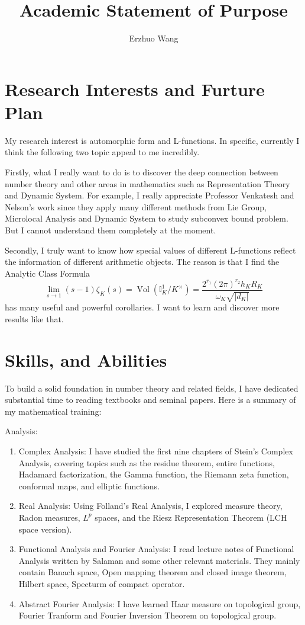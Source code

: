 \documentclass[12pt]{article}
\title{Academic Statement of Purpose}
\author{Erzhuo Wang}
\date{}
\newcommand{\bb}[1]{\mathbb{#1}}
\newenvironment{enu}{\begin{enumerate}[(1)]}{\end{enumerate}}
\theoremstyle{definition}
\begin{document}
\maketitle 
\section{Research Interests and Furture Plan}
My research interest is automorphic form and L-functions. In specific, currently I think the following two topic
appeal to me incredibly. 

Firstly, what I really want to do is to 
discover the deep connection between number theory and other areas in mathematics such as Representation Theory 
and Dynamic System. 
For example, I really appreciate Professor Venkatesh and Nelson's work since they apply many different 
methods from Lie Group, Microlocal Analysis and Dynamic System to study subconvex bound problem. 
But I cannot understand them completely at the moment. 

Secondly, I truly want to know how special values of different 
L-functions reflect the information of different arithmetic objects. 
The reason is that 
I find the Analytic Class Formula
$$
\lim_{s\rightarrow 1}(s-1)\zeta_K(s)=\operatorname{Vol}\left(\bb{I}_K^1/K^\times\right)=\frac{2^{r_1}(2\pi)^{r_2}h_K R_K}{\omega_K \sqrt{|d_K|}}
$$
has many useful and powerful corollaries. I want to learn and discover more results like that.

\section{Skills, and Abilities}
To build a solid foundation in number theory and related fields, I have dedicated substantial time to reading textbooks and seminal papers. 
Here is a summary of my mathematical training:

Analysis: 
\begin{enu} 
\item Complex Analysis: I have studied the first nine chapters of Stein's Complex Analysis, covering topics such as the residue theorem, entire functions, 
Hadamard factorization, the Gamma function, 
the Riemann zeta function, conformal maps, and elliptic functions.

\item Real Analysis: Using Folland's Real Analysis, I explored measure theory, Radon measures, $L^p$
  spaces, and the Riesz Representation Theorem (LCH space version).

\item Functional Analysis and Fourier Analysis: I read lecture notes of Functional Analysis 
written by Salaman and some other relevant materials. 
They mainly contain 
Banach space, Open mapping theorem and closed image theorem, Hilbert space, Specturm of compact operator.

\item Abstract Fourier Analysis: I have learned 
Haar measure on topological group, Fourier Tranform and Fourier Inversion Theorem on topological group.

\end{enu}
\end{document}
